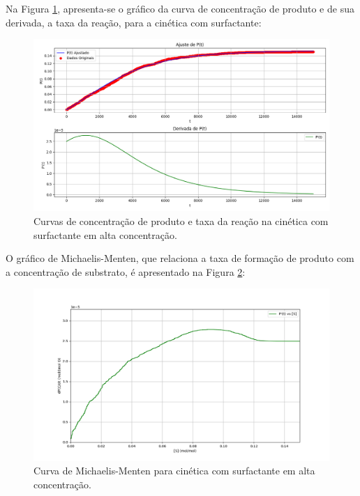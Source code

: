 \documentclass[12pt,oneside]{report}
\begin{document}
Na Figura \ref{fig:MM_surf_rate_high}, apresenta-se o gráfico da curva de concentração de produto e de sua derivada, a taxa da reação, para a cinética com surfactante:

\begin{figure}[H]
    \centering
    \includegraphics[width=1\textwidth]{img/MM_surf_rate_high.png}
    \caption{\small Curvas de concentração de produto e taxa da reação na cinética com surfactante em alta concentração.}
    \label{fig:MM_surf_rate_high}
\end{figure}

O gráfico de Michaelis-Menten, que relaciona a taxa de formação de produto com a concentração de substrato, é apresentado na Figura \ref{fig:MM_surf_curve_high}:

\begin{figure}[H]
    \centering
    \includegraphics[width=1\textwidth]{img/MM_surf_curve_high.png}
    \caption{\small Curva de Michaelis-Menten para cinética com surfactante em alta concentração.}
    \label{fig:MM_surf_curve_high}
\end{figure}
\end{document}
